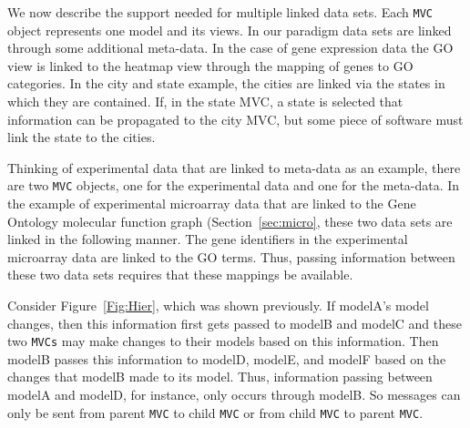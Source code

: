\documentclass{article}[11pt]
\newcommand{\Robject}[1]{{\texttt{#1}}}
\begin{document}

We now describe the support needed for multiple linked data sets.
Each \Robject{MVC} object represents one model and its views.  In our
paradigm data sets are linked through some additional meta-data. In
the case of gene expression data the GO view is linked to the heatmap
view through the mapping of genes to GO categories. In the city and
state example, the cities are linked via the states in which they are
contained. If, in the state MVC, a state is selected that information
can be propagated to the city MVC, but some piece of software must
link the state to the cities. %

Thinking of experimental data that are linked to meta-data as an
example, there are two \Robject{MVC} objects, one for the experimental
data and one for the meta-data.  In the example of experimental
microarray data that are linked to the Gene Ontology molecular
function graph (Section~\ref{sec:micro}, these two data sets are
linked in the following manner. The gene identifiers in the
experimental microarray data are linked to the GO terms.  Thus,
passing information between these two data sets requires that these
mappings be available.

Consider Figure~\ref{Fig:Hier}, which was shown previously.  If
modelA's model changes, then this information first gets passed to
modelB and modelC and these two \Robject{MVCs} may make changes to
their models based on this information.  Then modelB passes this
information to modelD, modelE, and modelF based on the changes
that modelB made to its model.  Thus, information passing between
modelA and modelD, for instance, only occurs through modelB.  So
messages can only be sent from parent \Robject{MVC} to child
\Robject{MVC} or from child \Robject{MVC} to parent \Robject{MVC}.
\end{document}
